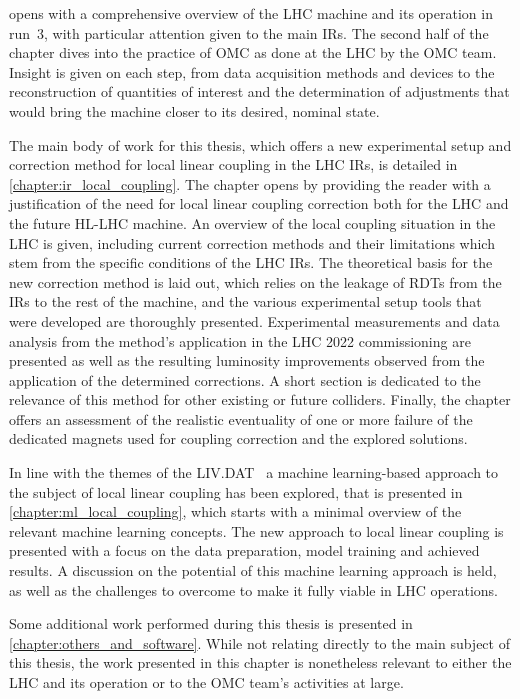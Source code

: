  opens with a comprehensive overview of the \gls{LHC} machine and its operation in \Gls{run}~\num{3}, with particular attention given to the main \glspl{IR}.
The second half of the chapter dives into the practice of \gls{OMC} as done at the \gls{LHC} by the \gls{OMC} team.
Insight is given on each step, from data acquisition methods and devices to the reconstruction of quantities of interest and the determination of adjustments that would bring the machine closer to its desired, nominal state.

The main body of work for this thesis, which offers a new experimental setup and correction method for local linear coupling in the \gls{LHC} \glspl{IR}, is detailed in \cref{chapter:ir_local_coupling}.
The chapter opens by providing the reader with a justification of the need for local linear coupling correction both for the \gls{LHC} and the future \gls{HL-LHC} machine.
An overview of the local coupling situation in the \gls{LHC} is given, including current correction methods and their limitations which stem from the specific conditions of the \gls{LHC} \glspl{IR}.
The theoretical basis for the new correction method is laid out, which relies on the leakage of \glspl{RDT} from the \glspl{IR} to the rest of the machine, and the various experimental setup tools that were developed are thoroughly presented.
Experimental measurements and data analysis from the method's application in the \gls{LHC} \num{2022} commissioning are presented as well as the resulting \gls{luminosity} improvements observed from the application of the determined corrections.
A short section is dedicated to the relevance of this method for other existing or future colliders.
Finally, the chapter offers an assessment of the realistic eventuality of one or more failure of the dedicated magnets used for coupling correction and the explored solutions.

In line with the themes of the \gls{LIV.DAT}~\cite{Website:LIVDAT} a machine learning-based approach to the subject of local linear coupling has been explored, that is presented in \cref{chapter:ml_local_coupling}, which starts with a minimal overview of the relevant machine learning concepts.
The new approach to local linear coupling is presented with a focus on the data preparation, model training and achieved results.
A discussion on the potential of this machine learning approach is held, as well as the challenges to overcome to make it fully viable in \gls{LHC} operations.

Some additional work performed during this thesis is presented in \cref{chapter:others_and_software}.
While not relating directly to the main subject of this thesis, the work presented in this chapter is nonetheless relevant to either the \gls{LHC} and its operation or to the \gls{OMC} team's activities at large.

